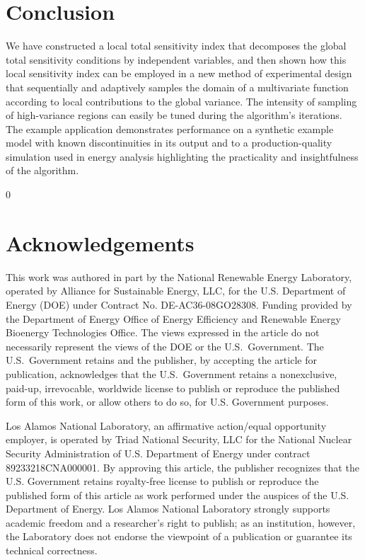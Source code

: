 \documentclass[12pt]{article}
\newcommand{\blind}{0}
\begin{document}
\section{Conclusion}
\label{sec:conclude}

We have constructed a local total sensitivity index that decomposes the global total sensitivity conditions by independent variables, and then shown how this local sensitivity index can be employed in a new method of experimental design that sequentially and adaptively samples the domain of a multivariate function according to local contributions to the global variance. The intensity of sampling of high-variance regions can easily be tuned during the algorithm's iterations. The example application demonstrates performance on a synthetic example model with known discontinuities in its output and to a production-quality simulation used in energy analysis highlighting the practicality and insightfulness of the algorithm.

\blind {
\section*{Acknowledgements}

This work was authored in part by the National Renewable Energy Laboratory, operated by Alliance for Sustainable Energy, LLC, for the U.S. Department of Energy (DOE) under Contract No. DE-AC36-08GO28308. Funding provided by the Department of Energy Office of Energy Efficiency and Renewable Energy Bioenergy Technologies Office. The views expressed in the article do not necessarily represent the views of the DOE or the U.S.\ Government. The U.S.\ Government retains and the publisher, by accepting the article for publication, acknowledges that the U.S.\ Government retains a nonexclusive, paid-up, irrevocable, worldwide license to publish or reproduce the published form of this work, or allow others to do so, for U.S. Government purposes.

Los Alamos National Laboratory, an affirmative action/equal opportunity employer, is operated by Triad National Security, LLC for the National Nuclear Security Administration of U.S. Department of Energy under contract 89233218CNA000001. By approving this article, the publisher recognizes that the U.S. Government retains royalty-free license to publish or reproduce the published form of this article as work performed under the auspices of the U.S. Department of Energy. Los Alamos National Laboratory strongly supports academic freedom and a researcher’s right to publish; as an institution, however, the Laboratory does not endorse the viewpoint of a publication or guarantee its technical correctness.

} \fi
\end{document}
